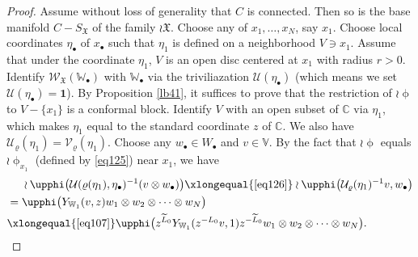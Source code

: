 \documentclass[12pt,b5paper,notitlepage]{report}
\theoremstyle{definition}
\theoremstyle{plain}
\newcommand{\fk}{\mathfrak}
\newcommand{\mc}{\mathcal}
\newcommand{\wtd}{\widetilde}
\newcommand{\id}{\mathbf{1}}
\newcommand{\scr}{\mathscr}
\newcommand{\blt}{\bullet}
\newcommand{\Vbb}{\mathbb V}
\newcommand{\Wbb}{\mathbb W}
\newcommand{\Cbb}{\mathbb C}
\numberwithin{equation}{section}
\begin{document}
\begin{proof}
Assume without loss of generality that $C$ is connected. Then so is the base manifold $C-S_{\fk X}$ of the family $\wr\fk X$. Choose any of $x_1,\dots,x_N$, say $x_1$. Choose local coordinates $\eta_\blt$ of $x_\blt$ such that  $\eta_1$ is defined on a neighborhood $V\ni x_1$. Assume that under the coordinate $\eta_1$, $V$ is an open disc centered at $x_1$ with radius $r>0$. Identify $\scr W_{\fk X}(\Wbb_\blt)$ with $\Wbb_\blt$ via the triviliazation $\mc U(\eta_\blt)$ (which means we set $\mc U(\eta_\blt)=\id$). By Proposition \ref{lb41}, it suffices to prove that the restriction of $\wr\upphi$ to $V-\{x_1\}$ is a conformal block. Identify $V$ with an open subset of $\Cbb$ via $\eta_1$, which makes  $\eta_1$ equal to the standard coordinate $z$ of $\Cbb$. We also have $\mc U_\varrho(\eta_1)=\mc V_\varrho(\eta_1)$. Choose any $w_\blt\in W_\blt$ and $v\in\Vbb$. By the fact that $\wr\upphi$ equals $\wr\upphi_{x_1}$ (defined by \eqref{eq125}) near $x_1$, we have
\begin{align}
&~~~~\wr\upphi\big(\mc U(\varrho(\eta_1),\eta_\blt)^{-1}(v\otimes w_\blt)\big)\xlongequal{\eqref{eq126}}\wr\upphi\big(\mc U_\varrho(\eta_1)^{-1}v, w_\blt\big)\nonumber\\
&=\upphi\big(Y_{\Wbb_1}(v,z)w_1\otimes w_2\otimes \dots\otimes w_N\big)\nonumber\\
&\xlongequal{\eqref{eq107}}\upphi\big(z^{\wtd L_0}Y_{\Wbb_1}(z^{-L_0}v,1)z^{-\wtd L_0}w_1\otimes w_2\otimes \dots\otimes w_N\big).\label{eq127}
\end{align}


\end{proof}
\end{document}

